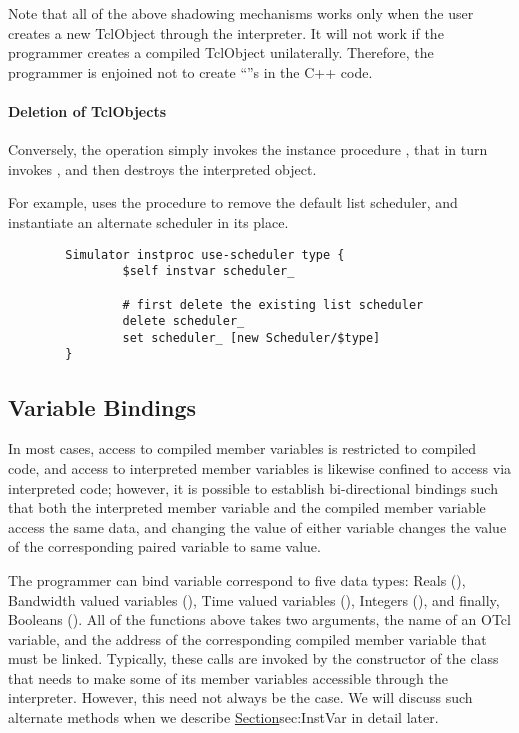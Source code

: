 \documentclass{article}
\begin{document}
Note that all of the above shadowing mechanisms works only when
the user creates a new TclObject through the interpreter.
It will not work if the programmer creates a compiled TclObject
unilaterally.
Therefore, the programmer is enjoined not to create ``''s
in the C++ code.

\paragraph{Deletion of TclObjects}
Conversely, the  operation simply invokes the
instance procedure , that in turn invokes
, 
and then destroys the interpreted object.

For example,
uses the  procedure to remove the default list scheduler,
and instantiate an alternate scheduler in its place.
\begin{verbatim}
        Simulator instproc use-scheduler type {
                $self instvar scheduler_

                # first delete the existing list scheduler
                delete scheduler_
                set scheduler_ [new Scheduler/$type]
        }
\end{verbatim}

\subsection{Variable Bindings}
\label{sec:VarBinds}

In most cases,
access to compiled member variables is restricted to compiled code,
and access to interpreted member variables is likewise
confined to access via interpreted code;
however, it is possible to establish bi-directional bindings
such that both the interpreted member variable
and the compiled member variable access the same data, 
and changing the value of either variable
changes the value of the corresponding paired variable to same value.

The programmer can bind variable correspond to five data types:
Reals (),
Bandwidth valued variables
(),
Time valued variables
(),
Integers (),
and finally,
Booleans ().
All of the functions above takes two arguments,
the name of an OTcl variable,
and the address of the corresponding compiled member variable that must
be linked.
Typically, these calls are invoked by the constructor of the class that
needs to make some of its member variables accessible through the interpreter.
However, this need not always be the case.
We will discuss such alternate methods
when we describe \href{the class InstVar}{Section}{sec:InstVar}
in detail later.
\end{document}
